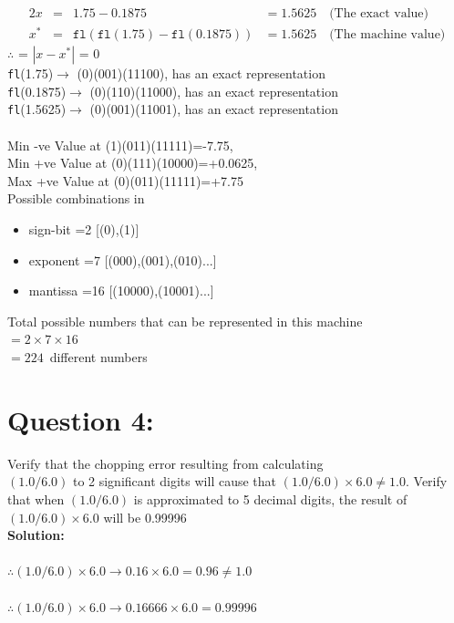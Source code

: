 \documentclass[a4paper,12pt]{article}
\begin{document}
 \begin{alignat*}{2}
 x  &=& 1.75 - 0.1875 &= 1.5625 \quad \text{(The exact value)}\\
 x^*&=& \texttt{fl}\left(\texttt{fl}(1.75)-\texttt{fl}(0.1875)\right) &=1.5625 \quad \text{(The machine value)}
  \end{alignat*}
   \indent \qquad $\therefore$  = \(|x - x^*|\) = $0$\\[0.2cm]
	\texttt{fl}(1.75)$\rightarrow$ (0)(001)(11100), has an exact representation\\
	\texttt{fl}(0.1875)$\rightarrow$ (0)(110)(11000), has an exact representation\\
	\texttt{fl}(1.5625)$\rightarrow$ (0)(001)(11001), has an exact representation\\
 \newpage
 \\
 \indent \qquad Min -ve Value at (1)(011)(11111)=-7.75,\\
 \indent \qquad Min +ve Value at (0)(111)(10000)=+0.0625,\\
 \indent \qquad Max +ve Value at (0)(011)(11111)=+7.75\\[1cm]
  Possible combinations in
 \begin{itemize}
 	\item \indent sign-bit =2  [(0),(1)]
 	\item exponent =7 [(000),(001),(010)...]
 	\item mantissa =16 [(10000),(10001)...]
 \end{itemize}
 \indent \quad Total possible numbers that can be represented in this machine\\
 \indent \quad $= 2\times 7 \times 16 $\\
 \indent \quad $= 224\,$ different numbers

\newpage
\section*{\LARGE Question 4:}
 Verify that the chopping error resulting from calculating\\
 $(1.0/6.0)$ to 2 significant digits will cause that $(1.0/6.0) \times 6.0 \neq 1.0$. Verify that when $(1.0/6.0)$ is
approximated to 5 decimal digits, the result of $(1.0/6.0) \times 6.0$ will be 0.99996\\[0.5cm]
 {\color{blue}\textbf{Solution: \\[0.4cm]}}
 \\[0.4cm]
\indent $\therefore (1.0/6.0) \times 6.0 \rightarrow 0.16 \times 6.0 =0.96 \neq 1.0$\\[0.4cm]
\\[0.4cm]
\indent $\therefore (1.0/6.0) \times 6.0 \rightarrow 0.16666 \times 6.0 = 0.99996$ 
\end{document}

